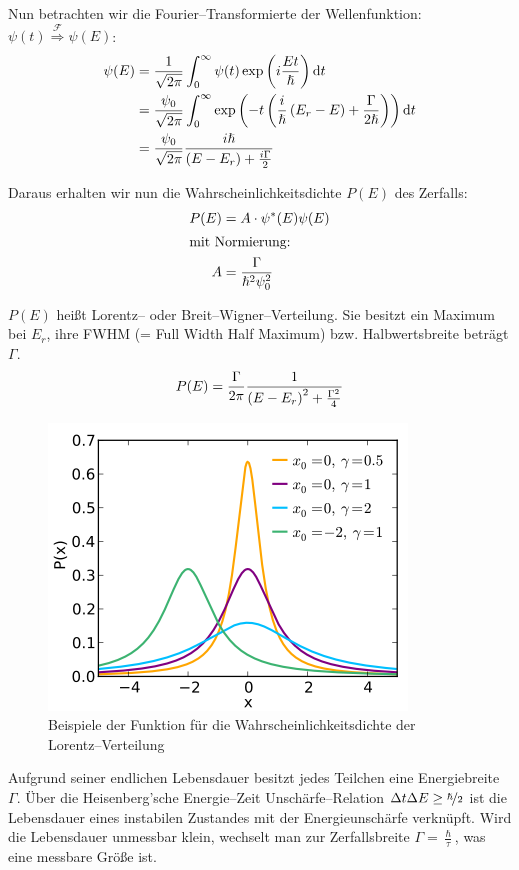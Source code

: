 \documentclass[Ex4_Zusammenfassung.tex]{subfiles}
\begin{document}
Nun betrachten wir die Fourier--Transformierte der Wellenfunktion: $\psi(t) \stackrel{\mathcal{F}}{\Rightarrow} \psi(E)$:
\begin{align}
	\psi(E) &= \frac{1}{\sqrt{2 \pi}} \int_{0}^{\infty} \psi (t) \exp \left( i \frac{E t}{\hslash}  \right) \mathrm{d} t\\
	&= \frac{\psi_0}{\sqrt{2 \pi}} \int_{0}^{\infty} \exp \left( -t \left( \frac{i}{\hslash} \left( E_r  - E \right) + \frac{\Gamma}{2 \hslash} \right) \right) \mathrm{d} t \\
	&= \frac{\psi_0}{\sqrt{2 \pi}} \frac{i \hslash}{\left( E - E_r \right) + \frac{i \Gamma}{2}}
\end{align}

Daraus erhalten wir nun die Wahrscheinlichkeitsdichte $P(E)$ des Zerfalls:
\begin{align}
	P(E) &= A \cdot \psi^*(E) \psi(E)\\
	\intertext{mit Normierung:}
	A &= \frac{\Gamma}{\hslash^2 \psi_0^2}
\end{align}

$P(E)$ heißt Lorentz-- oder Breit--Wigner--Verteilung. Sie besitzt ein Maximum bei $E_r$, ihre FWHM (= Full Width Half Maximum) bzw. Halbwertsbreite beträgt $\Gamma$.
\begin{equation}
	P(E) = \frac{\Gamma}{2 \pi} \frac{1}{\left( E - E_r  \right)^2 + \frac{\Gamma^2}{4}}
\end{equation}
\begin{figure}[H]
	\centering
	\includegraphics[scale=0.8]{Cauchy_pdf.png}
	\caption{Beispiele der Funktion für die Wahrscheinlichkeitsdichte der Lorentz--Verteilung}
\end{figure}

Aufgrund seiner endlichen Lebensdauer besitzt jedes Teilchen eine Energiebreite $\Gamma$. Über die Heisenberg'sche Energie--Zeit Unschärfe--Relation $\Delta t \Delta E \ge \nicefrac{\hslash}{2}$ ist die Lebensdauer eines instabilen Zustandes mit der Energieunschärfe verknüpft. Wird die Lebensdauer unmessbar klein, wechselt man zur Zerfallsbreite $\Gamma = \frac{\hslash}{\tau}$, was eine messbare Größe ist.\\
\end{document}
